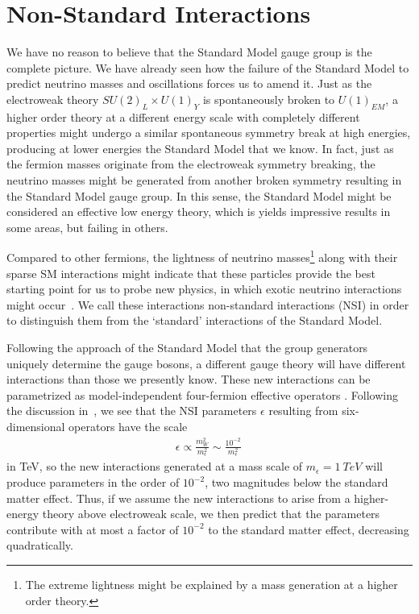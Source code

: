 \section{Non-Standard Interactions}\label{sec:nsiTheory}
We have no reason to believe that the Standard Model 
gauge group is the complete picture. We have already seen how the failure of the Standard Model to predict neutrino masses and 
oscillations forces us to amend it. 
Just as the electroweak theory $SU(2)_L \times U(1)_Y$ is 
spontaneously broken to $U(1)_{EM}$, a higher order theory at a different energy scale with completely different
properties might undergo a similar spontaneous symmetry break at high energies, 
producing at lower energies the Standard Model that we know. In fact, 
just as the fermion masses originate from the electroweak symmetry breaking, the neutrino masses might be generated from 
another broken symmetry resulting in the Standard Model gauge group.
In this sense, the Standard Model might be considered 
an effective low energy theory, which is yields impressive results in some areas, but failing in others. 

Compared to other fermions, the lightness of neutrino masses\footnote{The extreme lightness might be explained by a mass generation at a higher order theory.} along with their sparse SM interactions might 
indicate that these particles provide the best starting point for us to probe new physics, in which exotic neutrino interactions might occur~\cite{gavela2009}. We call these interactions non-standard interactions (NSI) in order to 
distinguish them from the `standard' interactions of the Standard Model.
 
Following the approach of the Standard Model that the group generators uniquely determine the gauge bosons, a different gauge
theory will have different interactions than those we presently know. These new interactions can be parametrized as model-independent four-fermion effective operators \cite{salvadoNSI,nsiFarzan}.
Following the discussion in~\cite{tommyNSI}, we see that the NSI parameters $\epsilon$ resulting from six-dimensional operators have the scale
\begin{align}
    \epsilon \propto \frac{m_W^2}{m_{\epsilon}^2} \sim \frac{10^{-2}}{m_\epsilon^2}\,
\end{align} 
in \si{\TeV}, so the new interactions generated at a mass scale of $m_\epsilon = \SI{1}{TeV}$ will produce parameters in the order of $10^{-2}$, 
two magnitudes below the standard matter effect. Thus, if we assume the new interactions to arise from a higher-energy theory above electroweak scale, 
we then predict that the parameters contribute with at most a factor of $10^{-2}$ to the standard matter effect, decreasing quadratically.


